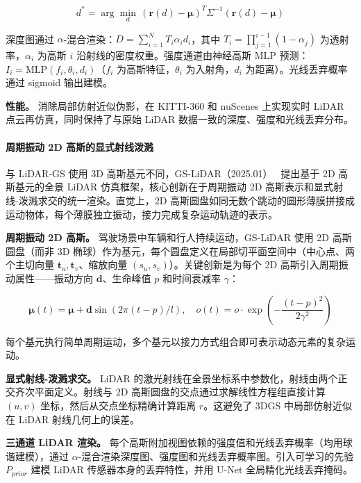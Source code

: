 \begin{equation*}
d^* = \arg\min_d \, (\mathbf{r}(d) - \boldsymbol{\mu})^T \Sigma^{-1} (\mathbf{r}(d) - \boldsymbol{\mu})
\end{equation*}

深度图通过 $\alpha$-混合渲染：$D = \sum_{i=1}^N T_i \alpha_i d_i$，其中 $T_i = \prod_{j=1}^{i-1}(1-\alpha_j)$ 为透射率，$\alpha_i$ 为高斯 $i$ 沿射线的密度权重。强度通道由神经高斯 MLP 预测：$I_i = \text{MLP}(f_i, \theta_i, d_i)$（$f_i$ 为高斯特征，$\theta_i$ 为入射角，$d_i$ 为距离）。光线丢弃概率通过 sigmoid 输出建模。

\textbf{性能。} 消除局部仿射近似伪影，在 KITTI-360 和 nuScenes 上实现实时 LiDAR 点云再仿真，同时保持了与原始 LiDAR 数据一致的深度、强度和光线丢弃分布。

\paragraph{周期振动 2D 高斯的显式射线泼溅}

与 LiDAR-GS 使用 3D 高斯基元不同，GS-LiDAR（2025.01）~\cite{2501_13971} 提出基于 2D 高斯基元的全景 LiDAR 仿真框架，核心创新在于周期振动 2D 高斯表示和显式射线-泼溅求交的统一渲染。直觉上，2D 高斯圆盘如同无数个跳动的圆形薄膜拼接成运动物体，每个薄膜独立振动，接力完成复杂运动轨迹的表示。

\textbf{周期振动 2D 高斯。} 驾驶场景中车辆和行人持续运动，GS-LiDAR 使用 2D 高斯圆盘（而非 3D 椭球）作为基元，每个圆盘定义在局部切平面空间中（中心点、两个主切向量 $\mathbf{t}_u, \mathbf{t}_v$、缩放向量 $(s_u, s_v)$）。关键创新是为每个 2D 高斯引入周期振动属性——振动方向 $\mathbf{d}$、生命峰值 $p$ 和时间衰减率 $\gamma$：

\begin{equation*}
\boldsymbol{\mu}(t) = \boldsymbol{\mu} + \mathbf{d} \sin(2\pi(t - p)/l), \quad o(t) = o \cdot \exp(-\frac{(t - p)^2}{2\gamma^2})
\end{equation*}

每个基元执行简单周期运动，多个基元以接力方式组合即可表示动态元素的复杂运动。

\textbf{显式射线-泼溅求交。} LiDAR 的激光射线在全景坐标系中参数化，射线由两个正交齐次平面定义。射线与 2D 高斯圆盘的交点通过求解线性方程组直接计算 $(u, v)$ 坐标，然后从交点坐标精确计算距离 $r$。这避免了 3DGS 中局部仿射近似在 LiDAR 射线几何上的误差。

\textbf{三通道 LiDAR 渲染。} 每个高斯附加视图依赖的强度值和光线丢弃概率（均用球谐建模），通过 $\alpha$-混合渲染深度图、强度图和光线丢弃概率图。引入可学习的先验 $P_{prior}$ 建模 LiDAR 传感器本身的丢弃特性，并用 U-Net 全局精化光线丢弃掩码。

